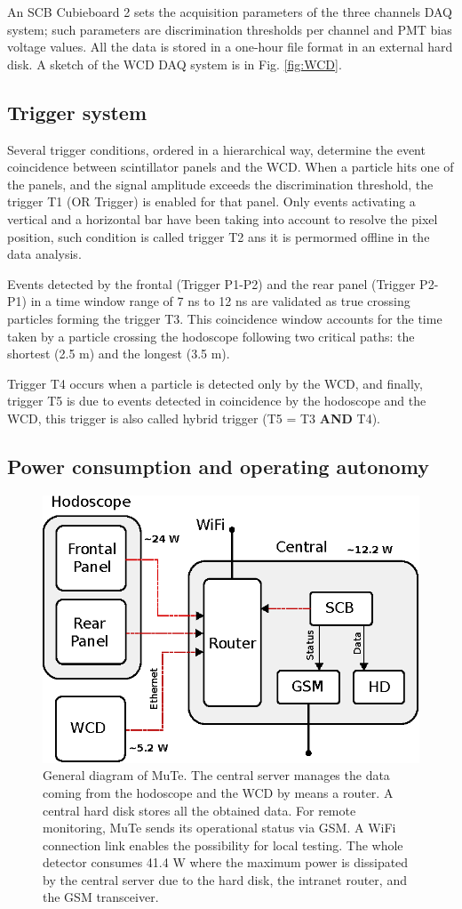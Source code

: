 \documentclass[letterpaper,11pt]{article}
\begin{document}
An SCB Cubieboard 2 sets the acquisition parameters of the three channels DAQ system; such parameters are discrimination thresholds per channel and PMT bias voltage values. All the data is stored in a one-hour file format in an external hard disk. A sketch of the WCD DAQ system is in Fig. \ref{fig:WCD}.

\subsection{Trigger system}
Several trigger conditions, ordered in a hierarchical way, determine the event coincidence between scintillator panels and the WCD. When a particle hits one of the panels, and the signal amplitude exceeds the discrimination threshold, the trigger T1 (OR Trigger) is enabled for that panel. Only events activating a vertical and a horizontal bar have been taking into account to resolve the pixel position, such condition is called trigger T2 ans it is permormed offline in the data analysis.

Events detected by the frontal (Trigger P1-P2) and the rear panel (Trigger P2-P1) in a time window range of 7 ns to 12 ns are validated as true crossing particles forming the trigger T3. This coincidence window accounts for the time taken by a particle crossing the hodoscope following two critical paths: the shortest (2.5 m) and the longest (3.5 m).

Trigger T4 occurs when a particle is detected only by the WCD, and finally, trigger T5 is due to events detected in coincidence by the hodoscope and the WCD, this trigger is also called hybrid trigger (T5 = T3 \textbf{AND} T4).

\subsection{Power consumption and operating autonomy}

\begin{figure}[htb]
\centering
\includegraphics[width=0.6\columnwidth]{Figures/Total.eps}
\caption{General diagram of MuTe. The central server manages the data coming from the hodoscope and the WCD by means a router.  A central hard disk stores all the obtained data. For remote monitoring, MuTe sends its operational status via GSM. A WiFi connection link enables the possibility for local testing. The whole detector consumes 41.4 W where the maximum power is dissipated by the central server due to the hard disk, the intranet router, and the GSM transceiver.}
\label{fig:power}
\end{figure}
\end{document}
